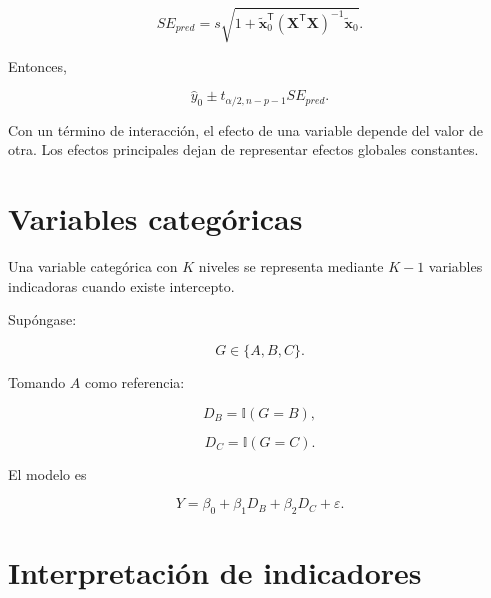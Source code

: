 \documentclass[
  spanish,
  10.5pt,
  letterpaper,
  DIV=11,
  numbers=noendperiod,
  oneside,
  open=any]{scrreprt}
\theoremstyle{definition}
\theoremstyle{definition}
\theoremstyle{plain}
\theoremstyle{remark}
\begin{document}

\[
SE_{pred}
=
s
\sqrt{
1+
\widetilde{\mathbf{x}}_0^{\mathsf T}
(\mathbf{X}^{\mathsf T}\mathbf{X})^{-1}
\widetilde{\mathbf{x}}_0
}.
\]

Entonces,

\[
\widehat{y}_0
\pm
t_{\alpha/2,n-p-1}
SE_{pred}.
\]

\begin{tcolorbox}[enhanced jigsaw, arc=.35mm, bottomrule=.15mm, bottomtitle=1mm, breakable, colback=white, colbacktitle=quarto-callout-note-color!10!white, colframe=quarto-callout-note-color-frame, coltitle=black, left=2mm, leftrule=.75mm, opacityback=0, opacitybacktitle=0.6, rightrule=.15mm, title=\textcolor{quarto-callout-note-color}{\faInfo}\hspace{0.5em}{Interacciones}, titlerule=0mm, toprule=.15mm, toptitle=1mm]

Con un término de interacción, el efecto de una variable depende del
valor de otra. Los efectos principales dejan de representar efectos
globales constantes.

\end{tcolorbox}

\section*{Variables categóricas}\label{variables-categuxf3ricas-1}


Una variable categórica con \(K\) niveles se representa mediante \(K-1\)
variables indicadoras cuando existe intercepto.

Supóngase:

\[
G
\in
\{
A,B,C
\}.
\]

Tomando \(A\) como referencia:

\[
D_B
=
\mathbb{I}(G=B),
\]

\[
D_C
=
\mathbb{I}(G=C).
\]

El modelo es

\[
Y
=
\beta_0
+
\beta_1D_B
+
\beta_2D_C
+
\varepsilon.
\]

\section*{Interpretación de
indicadores}\label{interpretaciuxf3n-de-indicadores}
\end{document}
